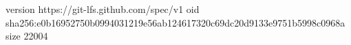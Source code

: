 version https://git-lfs.github.com/spec/v1
oid sha256:e0b16952750b0994031219e56ab124617320c69dc20d9133e9751b5998c0968a
size 22004
